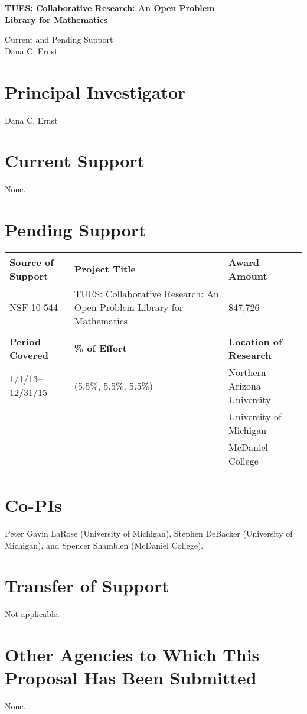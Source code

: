\documentclass[11pt]{article}
\begin{document}
\begin{center}
{\Large \textbf{TUES: Collaborative Research: An Open Problem\\
Library for Mathematics}}

\bigskip

{\Large Current and Pending Support}\\
\smallskip
Dana C. Ernst
\end{center}

\thispagestyle{empty}

\section{Principal Investigator}

\noindent Dana C. Ernst

\section{Current Support}

\noindent None.

\section{Pending Support}

\begin{tabularx}{6.4in}{@{}lXl}
\hline
\textbf{Source of Support} & \textbf{Project Title} & \textbf{Award Amount} \\
\hline
NSF 10-544 & TUES: Collaborative Research: An Open Problem Library for Mathematics & \$47,726\\
\\
\hline
\textbf{Period Covered} & \textbf{\% of Effort} & \textbf{Location of Research} \\
\hline
1/1/13--12/31/15 \ \ & (5.5\%, 5.5\%, 5.5\%) \ & Northern Arizona University \\ 
&& University of Michigan \\
&& McDaniel College\\
\end{tabularx}

\section{Co-PIs}

\noindent Peter Gavin LaRose (University of Michigan), Stephen DeBacker (University of Michigan), and Spencer Shamblen (McDaniel College).

\section{Transfer of Support}

\noindent Not applicable.

\section{Other Agencies to Which This Proposal Has Been Submitted}

None.
\end{document}
